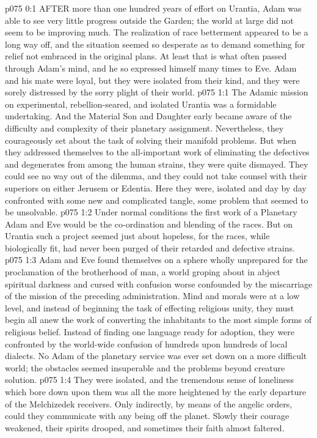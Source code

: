 \vs p075 0:1 AFTER more than one hundred years of effort on Urantia, Adam was able to see very little progress outside the Garden; the world at large did not seem to be improving much. The realization of race betterment appeared to be a long way off, and the situation seemed so desperate as to demand something for relief not embraced in the original plans. At least that is what often passed through Adam’s mind, and he so expressed himself many times to Eve. Adam and his mate were loyal, but they were isolated from their kind, and they were sorely distressed by the sorry plight of their world.
\vs p075 1:1 The Adamic mission on experimental, rebellion\hyp{}seared, and isolated Urantia was a formidable undertaking. And the Material Son and Daughter early became aware of the difficulty and complexity of their planetary assignment. Nevertheless, they courageously set about the task of solving their manifold problems. But when they addressed themselves to the all\hyp{}important work of eliminating the defectives and degenerates from among the human strains, they were quite dismayed. They could see no way out of the dilemma, and they could not take counsel with their superiors on either Jerusem or Edentia. Here they were, isolated and day by day confronted with some new and complicated tangle, some problem that seemed to be unsolvable.
\vs p075 1:2 Under normal conditions the first work of a Planetary Adam and Eve would be the co\hyp{}ordination and blending of the races. But on Urantia such a project seemed just about hopeless, for the races, while biologically fit, had never been purged of their retarded and defective strains.
\vs p075 1:3 Adam and Eve found themselves on a sphere wholly unprepared for the proclamation of the brotherhood of man, a world groping about in abject spiritual darkness and cursed with confusion worse confounded by the miscarriage of the mission of the preceding administration. Mind and morals were at a low level, and instead of beginning the task of effecting religious unity, they must begin all anew the work of converting the inhabitants to the most simple forms of religious belief. Instead of finding one language ready for adoption, they were confronted by the world\hyp{}wide confusion of hundreds upon hundreds of local dialects. No Adam of the planetary service was ever set down on a more difficult world; the obstacles seemed insuperable and the problems beyond creature solution.
\vs p075 1:4 They were isolated, and the tremendous sense of loneliness which bore down upon them was all the more heightened by the early departure of the Melchizedek receivers. Only indirectly, by means of the angelic orders, could they communicate with any being off the planet. Slowly their courage weakened, their spirits drooped, and sometimes their faith almost faltered.
